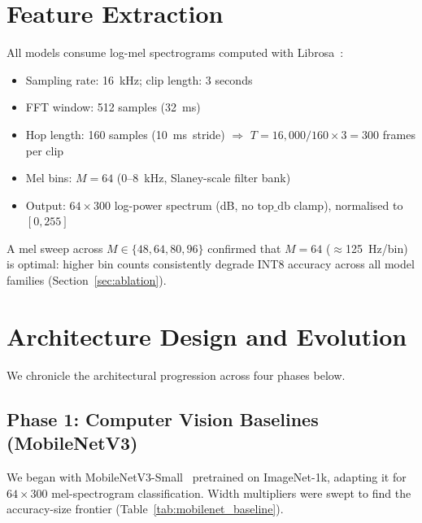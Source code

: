 \documentclass[final,5p,times,twocolumn,nolinenum]{elsarticle}
\begin{document}
\section{Feature Extraction}
\label{sec:features}

All models consume log-mel spectrograms computed with
Librosa~\cite{TODO-librosa}:
\begin{itemize}
  \item Sampling rate: \SI{16}{kHz}; clip length: 3 seconds
  \item FFT window: 512 samples (\SI{32}{ms})
  \item Hop length: 160 samples (\SI{10}{ms stride}) $\Rightarrow$
        $T = 16{,}000 / 160 \times 3 = 300$ frames per clip
  \item Mel bins: $M = 64$ (0--\SI{8}{kHz}, Slaney-scale filter bank)
  \item Output: $64 \times 300$ log-power spectrum (dB, no $\text{top\_db}$
        clamp), normalised to $[0, 255]$
\end{itemize}

A mel sweep across $M \in \{48, 64, 80, 96\}$ confirmed that $M=64$
($\approx$\SI{125}{Hz/bin}) is optimal: higher bin counts consistently
degrade INT8 accuracy across all model families
(Section~\ref{sec:ablation}).

\section{Architecture Design and Evolution}
\label{sec:architecture}

We chronicle the architectural progression across four phases below.

\subsection{Phase 1: Computer Vision Baselines (MobileNetV3)}
\label{sec:mobilenet}

We began with MobileNetV3-Small~\cite{howard2019searching} pretrained on
ImageNet-1k, adapting it for $64 \times 300$ mel-spectrogram
classification. Width multipliers were swept to find the accuracy-size
frontier (Table~\ref{tab:mobilenet_baseline}).
\end{document}
